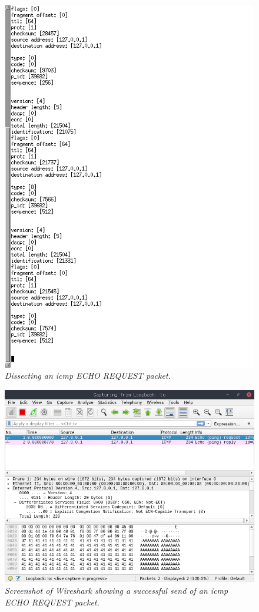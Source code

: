 \documentclass[titlepage]{article}
\begin{document}
\begin{figure}[H]
  \centering
  \includegraphics[width=\textwidth]{deconstructed_headers.png}
  \caption{\textit{%
    Dissecting an \gls{icmp} ECHO REQUEST packet.
}}\label{echodissect}
\end{figure}

\begin{figure}[H]
  \centering
  \includegraphics[width=\textwidth]{ping_send_success.png}
  \caption{\textit{%
    Screenshot of Wireshark showing a successful send of an \gls{icmp} ECHO REQUEST packet.
}}\label{pingsuccess}
\end{figure}
\end{document}
